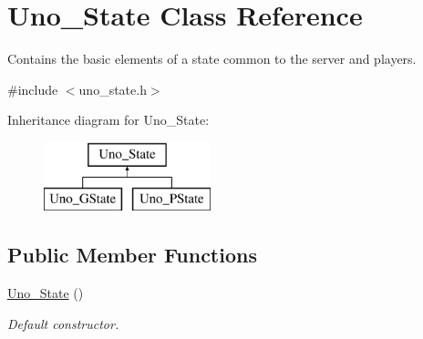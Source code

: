 \hypertarget{class_uno___state}{
\section{\-Uno\-\_\-\-State \-Class \-Reference}
\label{class_uno___state}
}


\-Contains the basic elements of a state common to the server and players.  




{\ttfamily \#include $<$uno\-\_\-state.\-h$>$}

\-Inheritance diagram for \-Uno\-\_\-\-State\-:\begin{figure}[H]
\begin{center}
\leavevmode
\includegraphics[height=2.000000cm]{class_uno___state}
\end{center}
\end{figure}
\subsection*{\-Public \-Member \-Functions}
\begin{DoxyCompactItemize}
\item 
\hyperlink{class_uno___state_a9c349d9df19daaee8353dde4e8b3575c}{\-Uno\-\_\-\-State} ()
\begin{DoxyCompactList}\small\item\em \-Default constructor. \end{DoxyCompactList}\end{DoxyCompactItemize}
